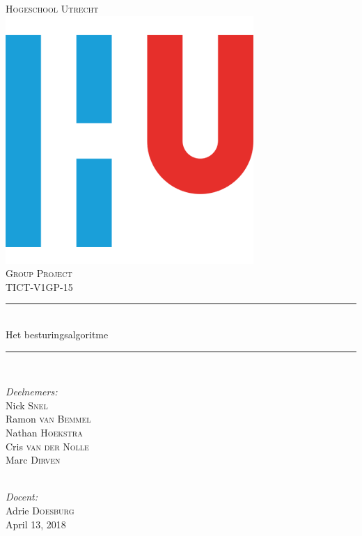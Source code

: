 \documentclass[12pt]{article}
\begin{document}
	\begin{titlepage}
		\newcommand{\HRule}{\rule{\linewidth}{0.5mm}} 
		\center
		\textsc{\LARGE Hogeschool Utrecht}\\[1.5cm]
		\includegraphics[scale=.25]{hu-logo}\\ [1cm] %
		\textsc{\Large Group Project}\\[0.5cm] %
		\textsc{\large TICT-V1GP-15}\\[0.5cm] %
		\HRule \\[0.4cm]
		{ \huge Het besturingsalgoritme} \\[0.2cm] %
		\HRule \\[1.5cm]
		\begin{minipage}{0.4\textwidth}
			\begin{flushleft} \large
				\center
				\large \emph{Deelnemers:}\\
				Nick \textsc{Snel}\\
				Ramon \textsc{van Bemmel}\\
				Nathan \textsc{Hoekstra}\\
				Cris \textsc{van der Nolle}\\
				Marc \textsc{Dirven}
			\end{flushleft}
		\end{minipage}\\[1cm]
		\Large \emph{Docent:}\\
		Adrie \textsc{Doesburg}\\[.5cm]
		April 13, 2018
	\end{titlepage}
\newpage
	\renewcommand{\contentsname}{Inhoudsopgave} %
	\tableofcontents
	
\end{document}
